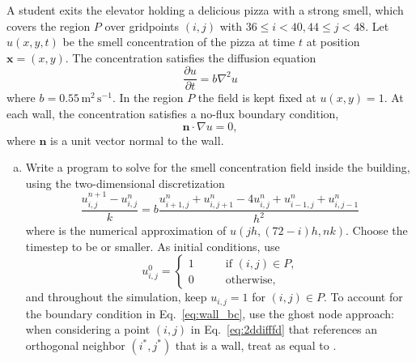 \documentclass{article}
\newcommand{\p}{\partial}
\renewcommand{\vec}[1]{\mathbf{#1}}
\newcommand{\vx}{\vec{x}}
\begin{document}
\begin{problem}
    A student exits the elevator holding a delicious pizza with a strong smell,
        which covers the region $P$ over gridpoints $(i,j)$ with $36\le i < 40,
          44\le j <48$. Let $u(x,y,t)$ be the smell concentration of the pizza at time
        $t$ at position $\vx=(x,y)$. The concentration satisfies the diffusion
        equation
        \begin{equation}
          \frac{\p u}{\p t} = b \nabla^2 u
        \end{equation}
        where $b=0.55\,\text{m}^2\,\text{s}^{-1}$. In the region $P$ the field is
        kept fixed at $u(x,y)=1$. At each wall, the concentration satisfies a
        no-flux boundary condition,
        \begin{equation}
          \vec{n} \cdot \nabla u =0, \label{eq:wall_bc}
        \end{equation}
        where $\vec{n}$ is a unit vector normal to the wall.
        \begin{enumerate}[(a)]
          \item Write a program to solve for the smell concentration field inside
                the building, using the two-dimensional discretization
                \begin{equation}
                  \frac{u_{i,j}^{n+1} - u_{i,j}^n}{k} = b \frac{u_{i+1,j}^n + u_{i,j+1}^n - 4u_{i,j}^n + u_{i-1,j}^n+u_{i,j-1}^n}{h^2} \label{eq:2ddifffd}
                \end{equation}
                where  is the numerical approximation of
                $u(jh,(72-i)h,nk)$. Choose the timestep to be  or smaller. As initial conditions, use
                \begin{equation}
                  u_{i,j}^0=\begin{cases}
                    1 & \qquad \text{if $(i,j)\in P$,} \\
                    0 & \qquad \text{otherwise,}
                  \end{cases}
                \end{equation}
                and throughout the simulation, keep $u_{i,j}=1$ for $(i,j)\in P$.
                To account for the boundary condition in Eq.~\eqref{eq:wall_bc}, use the
                ghost node approach: when considering a point $(i,j)$ in
                Eq.~\eqref{eq:2ddifffd} that references an orthogonal neighbor $(i^*,j^*)$
                that is a wall, treat  as equal to .

\end{enumerate}
\end{problem}
\end{document}
